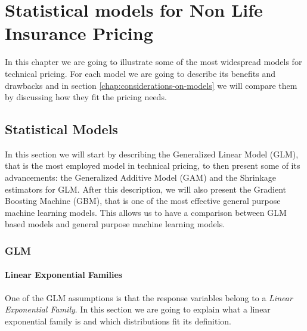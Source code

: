 \documentclass[a4paper, nobind]{templates/ociamthesis}
\theoremstyle{definition}
\theoremstyle{definition}
\theoremstyle{definition}
\theoremstyle{remark}
\begin{document}
\hypertarget{chap:models}{%
\chapter{\texorpdfstring{\textbf{Statistical models for Non Life Insurance Pricing}}{Statistical models for Non Life Insurance Pricing}}\label{chap:models}}

\minitoc  


In this chapter we are going to illustrate some of the most widespread models for technical pricing. For each model we are going to describe its benefits and drawbacks and in section \ref{chap:considerations-on-models} we will compare them by discussing how they fit the pricing needs.

\hypertarget{statistical-models}{%
\section{Statistical Models}\label{statistical-models}}

In this section we will start by describing the Generalized Linear Model (GLM), that is the most employed model in technical pricing, to then present some of its advancements: the Generalized Additive Model (GAM) and the Shrinkage estimators for GLM. After this description, we will also present the Gradient Boosting Machine (GBM), that is one of the most effective general purpose machine learning models. This allows us to have a comparison between GLM based models and general purpose machine learning models.

\hypertarget{glm}{%
\subsection{GLM}\label{glm}}

\hypertarget{chap:linear-exp-families}{%
\subsubsection{Linear Exponential Families}\label{chap:linear-exp-families}}

One of the GLM assumptions is that the response variables belong to a \emph{Linear Exponential Family}. In this section we are going to explain what a linear exponential family is and which distributions fit its definition.
\end{document}

